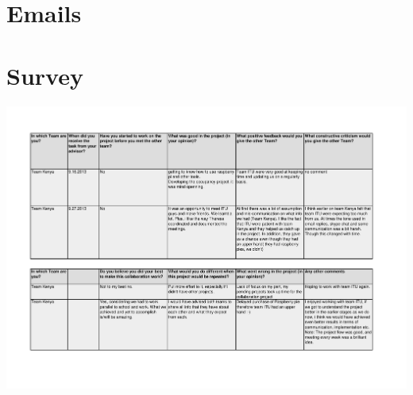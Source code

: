 \section{Emails}

\section{Survey}\label{sec:survey_result}
\includegraphics[scale=0.75,angle=90]{appendix/Survey_Answers_from_Team_Kenya.pdf}